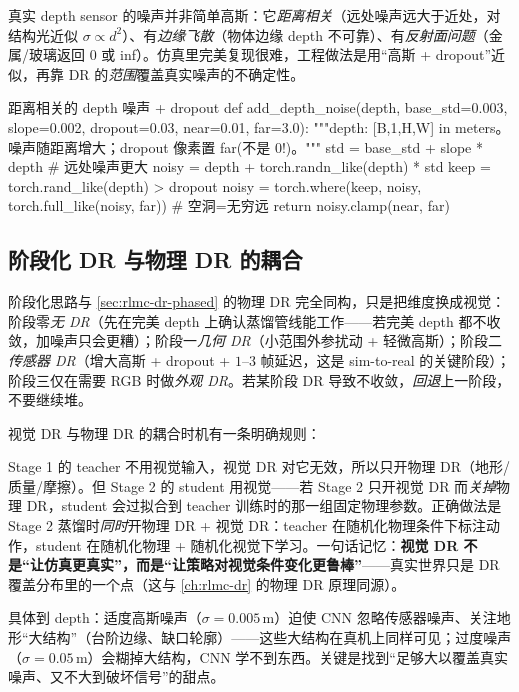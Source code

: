 真实 depth sensor 的噪声并非简单高斯：它\emph{距离相关}（远处噪声远大于近处，对结构光近似 $\sigma\propto d^2$）、有\emph{边缘飞散}（物体边缘 depth 不可靠）、有\emph{反射面问题}（金属/玻璃返回 $0$ 或 inf）。仿真里完美复现很难，工程做法是用“高斯 + dropout”近似，再靠 DR 的\emph{范围}覆盖真实噪声的不确定性。

\begin{codebox}[Python]{距离相关的 depth 噪声 + dropout}
def add_depth_noise(depth, base_std=0.003, slope=0.002,
                    dropout=0.03, near=0.01, far=3.0):
    """depth: [B,1,H,W] in meters。噪声随距离增大；dropout 像素置 far(不是 0!)。"""
    std = base_std + slope * depth                 # 远处噪声更大
    noisy = depth + torch.randn_like(depth) * std
    keep = torch.rand_like(depth) > dropout
    noisy = torch.where(keep, noisy, torch.full_like(noisy, far))  # 空洞=无穷远
    return noisy.clamp(near, far)
\end{codebox}

\subsection{阶段化 DR 与物理 DR 的耦合}
\label{sec:rlmc-vm-dr-phased}

阶段化思路与 \cref{sec:rlmc-dr-phased} 的物理 DR 完全同构，只是把维度换成视觉：阶段零\emph{无 DR}（先在完美 depth 上确认蒸馏管线能工作——若完美 depth 都不收敛，加噪声只会更糟）；阶段一\emph{几何 DR}（小范围外参扰动 + 轻微高斯）；阶段二\emph{传感器 DR}（增大高斯 + dropout + $1$--$3$ 帧延迟，这是 sim-to-real 的关键阶段）；阶段三仅在需要 RGB 时做\emph{外观 DR}。若某阶段 DR 导致不收敛，\emph{回退}上一阶段，不要继续堆。

视觉 DR 与物理 DR 的耦合时机有一条明确规则：

\begin{insight}\label{ins:rlmc-vm-drcouple}
Stage 1 的 teacher 不用视觉输入，视觉 DR 对它无效，所以只开物理 DR（地形/质量/摩擦）。但 Stage 2 的 student 用视觉——若 Stage 2 只开视觉 DR 而\emph{关掉}物理 DR，student 会过拟合到 teacher 训练时的那一组固定物理参数。正确做法是 Stage 2 蒸馏时\emph{同时}开物理 DR + 视觉 DR：teacher 在随机化物理条件下标注动作，student 在随机化物理 + 随机化视觉下学习。一句话记忆：\textbf{视觉 DR 不是“让仿真更真实”，而是“让策略对视觉条件变化更鲁棒”}——真实世界只是 DR 覆盖分布里的一个点（这与 \cref{ch:rlmc-dr} 的物理 DR 原理同源）。
\end{insight}

具体到 depth：适度高斯噪声（$\sigma=0.005$\,m）迫使 CNN 忽略传感器噪声、关注地形“大结构”（台阶边缘、缺口轮廓）——这些大结构在真机上同样可见；过度噪声（$\sigma=0.05$\,m）会糊掉大结构，CNN 学不到东西。关键是找到“足够大以覆盖真实噪声、又不大到破坏信号”的甜点。

